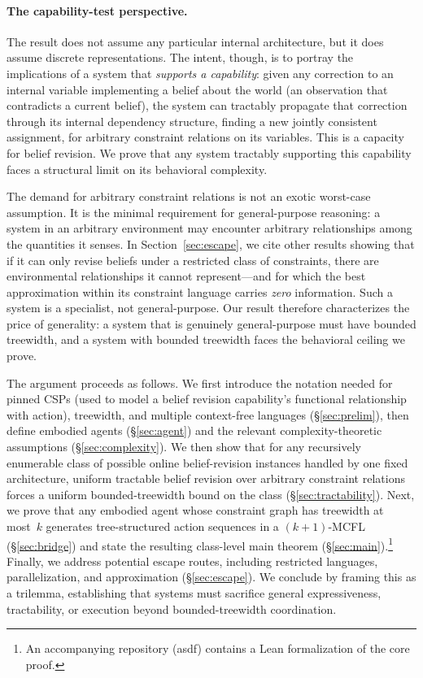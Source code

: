 \documentclass[runningheads]{llncs}
\begin{document}
\paragraph{The capability-test perspective.}
The result does not assume any particular internal architecture, but it does assume discrete representations.
The intent, though, is to portray the implications of a system that \emph{supports a capability}: given any correction to an internal variable implementing a belief about the world (an observation that contradicts a current belief), the system can tractably propagate that correction through its internal dependency structure, finding a new jointly consistent assignment, for arbitrary constraint relations on its variables.
This is a capacity for belief revision.
We prove that any system tractably supporting this capability faces a structural limit on its behavioral complexity.

The demand for arbitrary constraint relations is not an exotic worst-case assumption.
It is the minimal requirement for general-purpose reasoning: a system in an arbitrary environment may encounter arbitrary relationships among the quantities it senses.
In Section~\ref{sec:escape}, we cite other results showing that if it can only revise beliefs under a restricted class of constraints, there are environmental relationships it cannot represent---and for which the best approximation within its constraint language carries \emph{zero} information. Such a system is a specialist, not general-purpose. Our result therefore characterizes the price of generality: a system that is genuinely general-purpose must have bounded treewidth, and a system with bounded treewidth faces the behavioral ceiling we prove.

The argument proceeds as follows.
We first introduce the notation needed for pinned CSPs (used to model a belief revision capability's functional relationship with action), treewidth, and multiple context-free languages (\S\ref{sec:prelim}), then define embodied agents (\S\ref{sec:agent}) and the relevant complexity-theoretic assumptions (\S\ref{sec:complexity}).
We then show that for any recursively enumerable class of possible online belief-revision instances handled by one fixed architecture, uniform tractable belief revision over arbitrary constraint relations forces a uniform bounded-treewidth bound on the class (\S\ref{sec:tractability}).
Next, we prove that any embodied agent whose constraint graph has treewidth at most~$k$ generates tree-structured action sequences in a $(k{+}1)$-MCFL (\S\ref{sec:bridge}) and state the resulting class-level main theorem (\S\ref{sec:main}).\footnote{An accompanying repository (asdf) contains a Lean formalization of the core proof.}
Finally, we address potential escape routes, including restricted languages, parallelization, and approximation (\S\ref{sec:escape}). We conclude by framing this as a trilemma, establishing that systems must sacrifice general expressiveness, tractability, or execution beyond bounded-treewidth coordination. 
\end{document}
